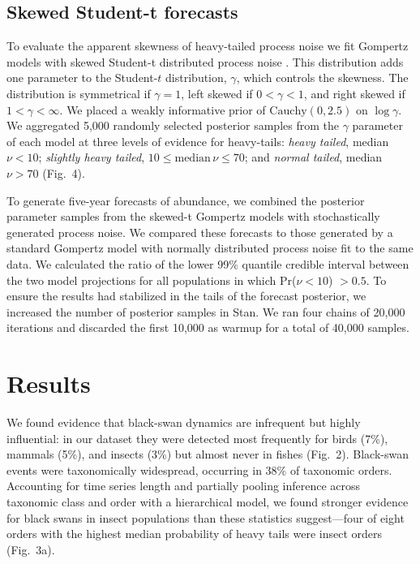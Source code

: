 \subsection{Skewed Student-t forecasts} To evaluate the apparent skewness
of heavy-tailed process noise we fit Gompertz models with skewed Student-t
distributed process noise \citep{fernandez1998}. This distribution adds one
parameter to the Student-$t$ distribution, \(\gamma\), which controls the
skewness. The distribution is symmetrical if \(\gamma = 1\), left skewed if \(0
< \gamma < 1\), and right skewed if \(1 < \gamma < \infty\). We placed a weakly
informative prior of \(\mathrm{Cauchy}(0, 2.5)\) on \(\log \gamma\). We
aggregated 5,000 randomly selected posterior samples from the \(\gamma\)
parameter of each model at three levels of evidence for heavy-tails:
\emph{heavy tailed}, median \(\nu < 10\); \emph{slightly heavy tailed}, \(10 \le
\mathrm{median}\, \nu \le 70\); and \emph{normal tailed}, median \(\nu > 70\)
(Fig.~4).

To generate five-year forecasts of abundance, we combined the posterior
parameter samples from the skewed-t Gompertz models with stochastically
generated process noise. We compared these forecasts to those generated by a
standard Gompertz model with normally distributed process noise fit to the same
data. We calculated the ratio of the lower 99\% quantile credible interval
between the two model projections for all populations in which Pr(\(\nu < 10\))
\(> 0.5\). To ensure the results had stabilized in the tails of the forecast
posterior, we increased the number of posterior samples in Stan. We ran four
chains of 20,000 iterations and discarded the first 10,000 as warmup for a
total of 40,000 samples.

\section{Results}

We found evidence that black-swan dynamics are infrequent but highly
influential: in our dataset they were detected most 
frequently for birds (7\%), mammals (5\%), and
insects (3\%) but almost never in fishes (Fig.~2). Black-swan
events were taxonomically widespread, occurring in 38\% of taxonomic orders.
Accounting for time series length and partially pooling inference across
taxonomic class and order with a hierarchical model, we found stronger evidence
for black swans in insect populations than these statistics suggest---four of
eight orders with the highest median probability of heavy tails were insect
orders (Fig.~3a).

